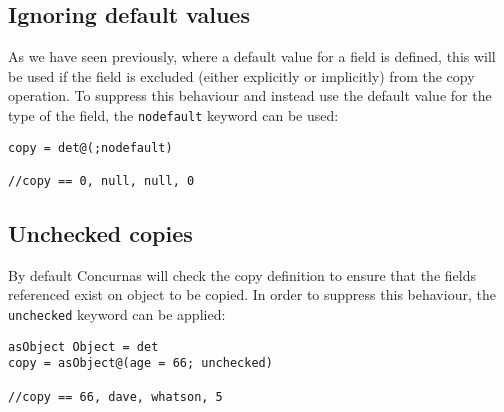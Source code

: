 \documentclass[conc-doc]{subfiles}
\begin{document}
\subsection{Ignoring default values}
As we have seen previously, where a default value for a field is defined, this will be used if the field is excluded (either explicitly or implicitly) from the copy operation. To suppress this behaviour and instead use the default value for the type of the field, the \lstinline{nodefault} keyword can be used:
\begin{lstlisting}
copy = det@(;nodefault)

//copy == 0, null, null, 0
\end{lstlisting}

\subsection{Unchecked copies}
By default Concurnas will check the copy definition to ensure that the fields referenced exist on object to be copied. In order to suppress this behaviour, the \lstinline{unchecked} keyword can be applied:
\begin{lstlisting}
asObject Object = det
copy = asObject@(age = 66; unchecked)

//copy == 66, dave, whatson, 5
\end{lstlisting}
\end{document}
